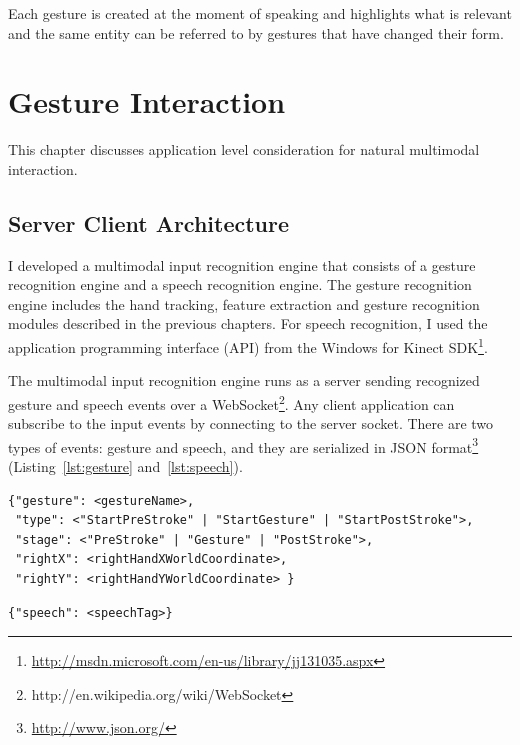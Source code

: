 \begin{savequote}[120mm]
Each gesture is created at the moment of speaking and highlights what is
relevant and the same entity can be referred to by gestures that have changed
their form.
\end{savequote}
\chapter{Gesture Interaction}
This chapter discusses application level consideration for natural multimodal
interaction.

\section{Server Client Architecture}
I developed a multimodal input recognition engine that consists of a gesture
recognition engine and a speech recognition engine. The gesture recognition
engine includes the hand tracking, feature extraction and gesture recognition
modules described in the previous chapters.
For speech recognition, I used the application programming interface (API) from
the Windows for Kinect SDK\footnote{\url{http://msdn.microsoft.com/en-us/library/jj131035.aspx}}.

The multimodal input recognition engine runs as a server sending recognized
gesture and speech events over a WebSocket\footnote{http://en.wikipedia.org/wiki/WebSocket}. Any client
application can subscribe to the input events by connecting to the server
socket. There are two types of events: gesture and speech, and they are
serialized in JSON format\footnote{\url{http://www.json.org/}}
(Listing~\ref{lst:gesture} and~\ref{lst:speech}).

\begin{lstlisting}[caption={Gesture event JSON object}, label={lst:gesture}]
{"gesture": <gestureName>, 
 "type": <"StartPreStroke" | "StartGesture" | "StartPostStroke">,
 "stage": <"PreStroke" | "Gesture" | "PostStroke">,
 "rightX": <rightHandXWorldCoordinate>,
 "rightY": <rightHandYWorldCoordinate> } 
\end{lstlisting}

\begin{lstlisting}[caption={Speech event JSON object}, label={lst:speech}]
{"speech": <speechTag>}
\end{lstlisting}

